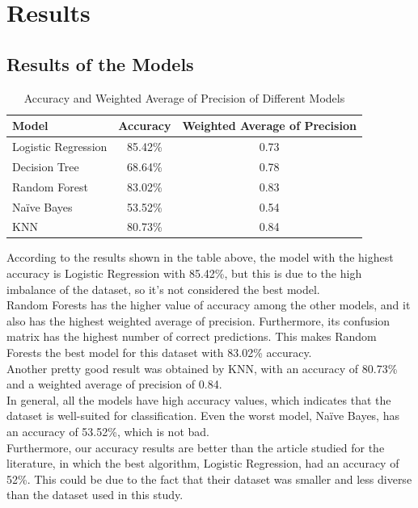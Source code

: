 

\chapter{Results}

\section{Results of the Models}

\begin{table}[htbp]
    \centering
    \begin{tabular}{|l|c|c|}
    \hline
    \textbf{Model}           & \textbf{Accuracy} & \textbf{Weighted Average of Precision} \\ \hline
    Logistic Regression & 85.42\%          & 0.73                \\ \hline
    Decision Tree       & 68.64\%          & 0.78              \\ \hline
    Random Forest      & 83.02\%          & 0.83             \\ \hline
    Naïve Bayes         & 53.52\%          & 0.54               \\ \hline
    KNN                 & 80.73\%          & 0.84               \\ \hline
    \end{tabular}
    \caption{Accuracy and Weighted Average of Precision of Different Models}
    \end{table}
    
According to the results shown in the table above, the model with the highest accuracy is Logistic Regression with 85.42\%, but this is due to the high imbalance of the dataset, so it's not considered the best model.\\
Random Forests has the higher value of accuracy among the other models, and it also has the highest weighted average of precision. Furthermore, its confusion matrix has the highest number of correct predictions. This makes Random Forests the best model for this dataset with 83.02\% accuracy. \\
Another pretty good result was obtained by KNN, with an accuracy of 80.73\% and a weighted average of precision of 0.84.\\
In general, all the models have high accuracy values, which indicates that the dataset is well-suited for classification. Even the worst model, Naïve Bayes, has an accuracy of 53.52\%, which is not bad.\\
Furthermore, our accuracy results are better than the article studied for the literature, in which the best algorithm, Logistic Regression, had an accuracy of 52\%. This could be due to the fact that their dataset was smaller and less diverse than the dataset used in this study.
\\

